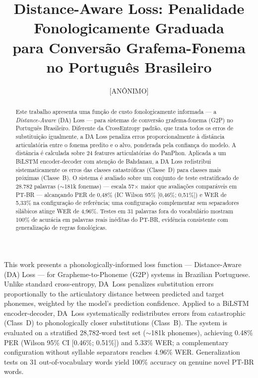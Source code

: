 \documentclass[12pt]{article}
\title{Distance-Aware Loss: Penalidade Fonologicamente Graduada\\para Convers\~ao Grafema-Fonema no Portugu\^es Brasileiro}
\author{[AN\^ONIMO]\inst{1}}
\begin{document}
\maketitle

\begin{abstract}
Este trabalho apresenta uma fun\c{c}\~ao de custo fonologicamente informada
--- a \emph{Distance-Aware} (DA) Loss --- para sistemas de convers\~ao
grafema-fonema (G2P) no Portugu\^es Brasileiro. Diferente da CrossEntropy
padr\~ao, que trata todos os erros de substitui\c{c}\~ao igualmente, a DA
Loss penaliza erros proporcionalmente \`a dist\^ancia articulat\'oria entre
o fonema predito e o alvo, ponderada pela confian\c{c}a do modelo.
A dist\^ancia \'e calculada sobre 24 features articulat\'orias do
PanPhon. Aplicada a um BiLSTM encoder-decoder com aten\c{c}\~ao de Bahdanau,
a DA Loss redistribui sistematicamente os erros das classes catastr\'oficas
(Classe~D) para classes mais pr\'oximas (Classe~B). O sistema \'e avaliado
sobre um conjunto de teste estratificado de 28.782 palavras
(${\sim}$181k fonemas) --- escala 57$\times$ maior que avalia\c{c}\~oes
compar\'aveis em PT-BR --- alcan\c{c}ando PER de 0,48\% (IC Wilson 95\%
[0,46\%; 0,51\%]) e WER de 5,33\% na configura\c{c}\~ao de refer\^encia;
uma configura\c{c}\~ao complementar sem separadores sil\'abicos atinge
WER de 4,96\%. Testes em 31 palavras fora do
vocabul\'ario mostram 100\% de acur\'acia em palavras reais in\'editas
do PT-BR, evid\^encia consistente com generaliza\c{c}\~ao de regras
fonol\'ogicas.
\end{abstract}

\begin{resumo}
  This work presents a phonologically-informed loss function ---
  Distance-Aware (DA) Loss --- for Grapheme-to-Phoneme (G2P) systems
  in Brazilian Portuguese. Unlike standard cross-entropy, DA~Loss
  penalizes substitution errors proportionally to the articulatory
  distance between predicted and target phonemes, weighted by the
  model's prediction confidence. Applied to a BiLSTM encoder-decoder,
  DA~Loss systematically redistributes errors from catastrophic
  (Class~D) to phonologically closer substitutions (Class~B). The
  system is evaluated on a stratified 28{,}782-word test set
  (${\sim}$181k phonemes), achieving 0.48\% PER (Wilson 95\% CI
  [0.46\%; 0.51\%]) and 5.33\% WER; a complementary configuration
  without syllable separators reaches 4.96\% WER. Generalization tests
  on 31 out-of-vocabulary words yield 100\% accuracy on genuine novel
  PT-BR words.
\end{resumo}
\end{document}
